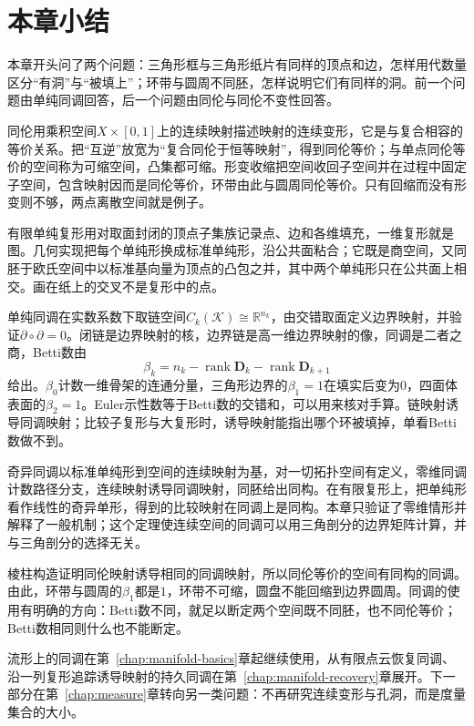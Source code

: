 \section{本章小结}
\label{sec:homol-summary}

本章开头问了两个问题：三角形框与三角形纸片有同样的顶点和边，怎样用代数量区分“有洞”与“被填上”；环带与圆周不同胚，怎样说明它们有同样的洞。前一个问题由单纯同调回答，后一个问题由同伦与同伦不变性回答。

同伦用乘积空间$X\times[0,1]$上的连续映射描述映射的连续变形，它是与复合相容的等价关系。把“互逆”放宽为“复合同伦于恒等映射”，得到同伦等价；与单点同伦等价的空间称为可缩空间，凸集都可缩。形变收缩把空间收回子空间并在过程中固定子空间，包含映射因而是同伦等价，环带由此与圆周同伦等价。只有回缩而没有形变则不够，两点离散空间就是例子。

有限单纯复形用对取面封闭的顶点子集族记录点、边和各维填充，一维复形就是图。几何实现把每个单纯形换成标准单纯形，沿公共面粘合；它既是商空间，又同胚于欧氏空间中以标准基向量为顶点的凸包之并，其中两个单纯形只在公共面上相交。画在纸上的交叉不是复形中的点。

单纯同调在实数系数下取链空间$C_k(\mathcal K)\cong\mathbb R^{n_k}$，由交错取面定义边界映射，并验证$\partial\circ\partial=0$。闭链是边界映射的核，边界链是高一维边界映射的像，同调是二者之商，Betti数由
\[
 \beta_k=n_k-\operatorname{rank}\bm D_k-\operatorname{rank}\bm D_{k+1}
\]
给出。$\beta_0$计数一维骨架的连通分量，三角形边界的$\beta_1=1$在填实后变为$0$，四面体表面的$\beta_2=1$。Euler示性数等于Betti数的交错和，可以用来核对手算。链映射诱导同调映射；比较子复形与大复形时，诱导映射能指出哪个环被填掉，单看Betti数做不到。

奇异同调以标准单纯形到空间的连续映射为基，对一切拓扑空间有定义，零维同调计数路径分支，连续映射诱导同调映射，同胚给出同构。在有限复形上，把单纯形看作线性的奇异单形，得到的比较映射在同调上是同构。本章只验证了零维情形并解释了一般机制；这个定理使连续空间的同调可以用三角剖分的边界矩阵计算，并与三角剖分的选择无关。

棱柱构造证明同伦映射诱导相同的同调映射，所以同伦等价的空间有同构的同调。由此，环带与圆周的$\beta_1$都是$1$，环带不可缩，圆盘不能回缩到边界圆周。同调的使用有明确的方向：Betti数不同，就足以断定两个空间既不同胚，也不同伦等价；Betti数相同则什么也不能断定。

流形上的同调在第~\ref{chap:manifold-basics}章起继续使用，从有限点云恢复同调、沿一列复形追踪诱导映射的持久同调在第~\ref{chap:manifold-recovery}章展开。下一部分在第~\ref{chap:measure}章转向另一类问题：不再研究连续变形与孔洞，而是度量集合的大小。
